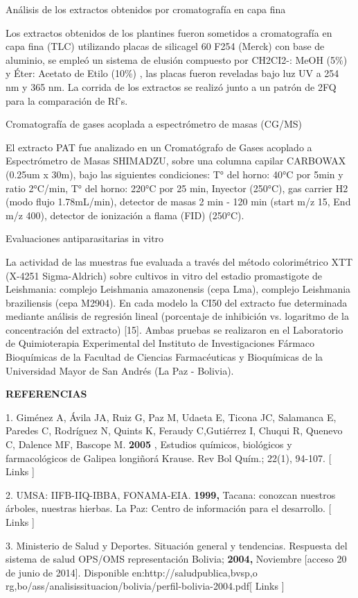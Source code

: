\documentclass{article}
\begin{document}
Análisis de los extractos obtenidos por cromatografía en capa fina

Los extractos obtenidos de los plantines fueron sometidos a cromatografía en
capa fina (TLC) utilizando placas de silicagel 60 F254 (Merck) con base de
aluminio, se empleó un sistema de elusión compuesto por CH2CI2-: MeOH (5\%) y
Éter: Acetato de Etilo (10\%) , las placas fueron reveladas bajo luz UV a 254 nm
y 365 nm. La corrida de los extractos se realizó junto a un patrón de 2FQ para
la comparación de Rf's.

Cromatografía de gases acoplada a espectrómetro de masas (CG/MS)

El extracto PAT fue analizado en un Cromatógrafo de Gases acoplado a
Espectrómetro de Masas SHIMADZU, sobre una columna capilar CARBOWAX (0.25um x
30m), bajo las siguientes condiciones: T° del horno: 40°C por 5min y ratio
2°C/min, T° del horno: 220°C por 25 min, Inyector (250°C), gas carrier H2 (modo
flujo 1.78mL/min), detector de masas 2 min - 120 min (start m/z 15, End m/z
400), detector de ionización a flama (FID) (250°C).

Evaluaciones antiparasitarias in vitro

La actividad de las muestras fue evaluada a través del método colorimétrico XTT
(X-4251 Sigma-Aldrich) sobre cultivos in vitro del estadio promastigote de
Leishmania: complejo Leishmania amazonensis (cepa Lma), complejo Leishmania
braziliensis (cepa M2904). En cada modelo la CI50 del extracto fue determinada
mediante análisis de regresión lineal (porcentaje de inhibición vs. logaritmo de
la concentración del extracto) [15]. Ambas pruebas se realizaron en el
Laboratorio de Quimioterapia Experimental del Instituto de Investigaciones
Fármaco Bioquímicas de la Facultad de Ciencias Farmacéuticas y Bioquímicas de la
Universidad Mayor de San Andrés (La Paz - Bolivia).

\textbf{REFERENCIAS}

1. Giménez A, Ávila JA, Ruiz G, Paz M, Udaeta E, Ticona JC, Salamanca E, Paredes
C, Rodríguez N, Quints K, Feraudy C,Gutiérrez I, Chuqui R, Quenevo C, Dalence
MF, Bascope M. \textbf{2005}
, Estudios químicos, biológicos y farmacológicos de Galipea longiñorá Krause.
Rev Bol Quím.; 22(1), 94-107. [ Links ]

2. UMSA: IIFB-IIQ-IBBA, FONAMA-EIA. \textbf{1999, }
Tacana: conozcan nuestros árboles, nuestras hierbas. La Paz: Centro de
información para el desarrollo. [ Links ]

3. Ministerio de Salud y Deportes. Situación general y tendencias. Respuesta del
sistema de salud OPS/OMS representación Bolivia; \textbf{2004, }
Noviembre [acceso 20 de junio de 2014]. Disponible en:http://saludpublica,bvsp,o
rg,bo/ass/analisissituacion/bolivia/perfil-bolivia-2004.pdf[ Links ]
\end{document}
